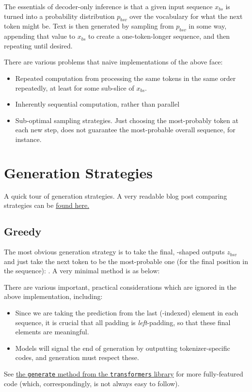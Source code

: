 \documentclass[11pt]{article}
\begin{document}
The essentials of decoder-only inference is that a given input sequence $ x _{ bs } $ is turned into
a probability distribution $ p _{ bsv } $ over the vocabulary for what the next token might be.  Text
is then generated by sampling from $ p _{ bsv } $ in some way, appending that value to $ x _{ bs } $
to create a one-token-longer sequence, and then repeating until desired.

There are various problems that naive implementations of the above face:
\begin{itemize}
    \item Repeated computation from processing the same tokens in the same order repeatedly, at least for
        some sub-slice of $ x _{ bs } $.
    \item Inherently sequential computation, rather than parallel
    \item Sub-optimal sampling strategies. Just choosing the most-probably token at each new step, does
    not guarantee the most-probable overall sequence, for instance.
\end{itemize}



\section{Generation Strategies \label{sec_generation_strats} }

A quick tour of generation strategies. A very readable blog post comparing strategies can be
\href{https://huggingface.co/blog/how-to-generate}{found here.}


\subsection{Greedy \label{subsec_greedy_gen}}

The most obvious generation strategy is to take the final, -shaped outputs $ z
_{ bsv } $ and just take the next token to be the most-probable one (for the final position in the
sequence): . A very minimal  method
is as below:

There are various important, practical considerations which are ignored in the above implementation, including:
\begin{itemize}
    \item Since we are taking the prediction from the last (-indexed) element in each
    sequence, it is crucial that all padding is \textit{left}-padding, so that these final
    elements are meaningful.
    \item Models will signal the end of generation by outputting tokenizer-specific codes, and
    generation must respect these.
\end{itemize}
See
\href{https://github.com/huggingface/transformers/blob/04ab5605fbb4ef207b10bf2772d88c53fc242e83/src/transformers/generation/utils.py#L1115}{the
\texttt{generate} method from the \texttt{transformers} library} for more fully-featured code
(which, correspondingly, is not always easy to follow).
\end{document}
